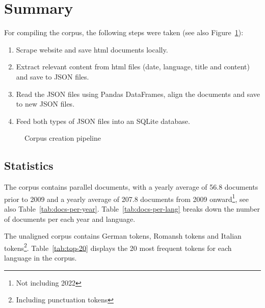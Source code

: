 \section{Summary}
For compiling the corpus, the following steps were taken (see also Figure~\ref{fig:corpus-creation-pipeline}):
\begin{enumerate}
	\item Scrape website and save \acrshort{html} documents locally.
	\item Extract relevant content from \acrshort{html} files (date, language, title and content) and save to \acrshort{JSON} files.
	\item Read the \acrshort{JSON} files using Pandas DataFrames, align the documents and save to new \acrshort{JSON} files.
	\item Feed both types of \acrshort{JSON} files into an SQLite database.
\end{enumerate}

\begin{figure}
\centering
{}
\caption{Corpus creation pipeline}
\label{fig:corpus-creation-pipeline}
\end{figure}


\subsection{Statistics}
The corpus contains  parallel documents, with a yearly average of 56.8 documents prior to 2009 and a yearly average of 207.8 documents from 2009 onward\footnote{Not including 2022}, 
see also Table~\ref{tab:docs-per-year}. Table~\ref{tab:docs-per-lang} breaks down the number of documents per each year and language. 

The unaligned corpus contains  German tokens,  Romansh tokens and  Italian tokens\footnote{Including punctuation tokens}. Table~\ref{tab:top-20} displays the 20 most frequent tokens for each language in the corpus.

